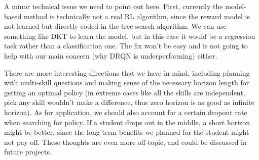 A minor technical issue we need to point out here. First, currently the model-based method is technically not a real RL algorithm, since the reward model is not learned but directly coded in the tree search algorithm. We can use something like DKT to learn the model, but in this case it would be a regression task rather than a classification one. The fix won't be easy and is not going to help with our main concern (why DRQN is underperforming) either.

There are more interesting directions that we have in mind, including planning with multi-skill questions and making sense of the necessary horizon length for getting an optimal policy (in extreme cases like all the skills are independent, pick any skill wouldn't make a difference, thus zero horizon is as good as infinite horizon). As for application, we should also account for a certain dropout rate when searching for policy. If a student drops out in the middle, a short horizon might be better, since the long-term benefits we planned for the student might not pay off. These thoughts are even more off-topic, and could be discussed in future projects.